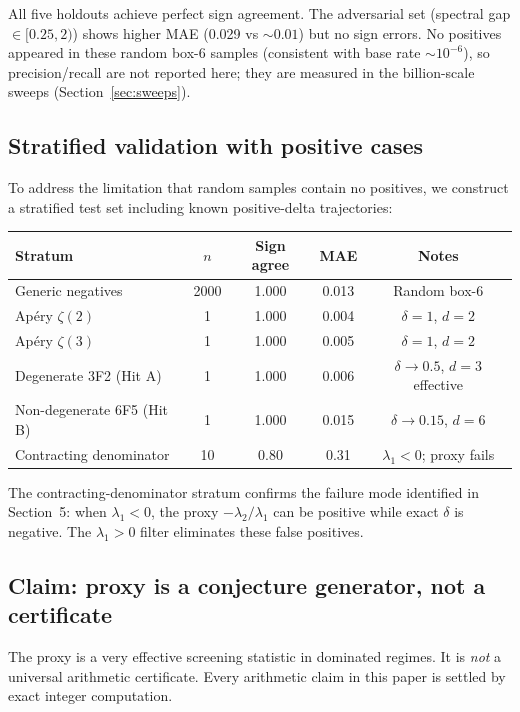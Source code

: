 \documentclass[11pt]{article}
\begin{document}
All five holdouts achieve perfect sign agreement. The adversarial set (spectral gap $\in [0.25, 2)$) shows higher MAE (0.029 vs $\sim 0.01$) but no sign errors. No positives appeared in these random box-6 samples (consistent with base rate $\sim 10^{-6}$), so precision/recall are not reported here; they are measured in the billion-scale sweeps (Section~\ref{sec:sweeps}).

\subsection{Stratified validation with positive cases}

To address the limitation that random samples contain no positives, we construct a stratified test set including known positive-delta trajectories:

\begin{center}
\begin{tabular}{lcccc}
\toprule
Stratum & $n$ & Sign agree & MAE & Notes \\
\midrule
Generic negatives & 2000 & 1.000 & 0.013 & Random box-6 \\
Ap\'ery $\zeta(2)$ & 1 & 1.000 & 0.004 & $\delta = 1$, $d=2$ \\
Ap\'ery $\zeta(3)$ & 1 & 1.000 & 0.005 & $\delta = 1$, $d=2$ \\
Degenerate 3F2 (Hit A) & 1 & 1.000 & 0.006 & $\delta \to 0.5$, $d=3$ effective \\
Non-degenerate 6F5 (Hit B) & 1 & 1.000 & 0.015 & $\delta \to 0.15$, $d=6$ \\
Contracting denominator & 10 & 0.80 & 0.31 & $\lambda_1 < 0$; proxy fails \\
\bottomrule
\end{tabular}
\end{center}

The contracting-denominator stratum confirms the failure mode identified in Section~5: when $\lambda_1 < 0$, the proxy $-\lambda_2/\lambda_1$ can be positive while exact $\delta$ is negative. The $\lambda_1 > 0$ filter eliminates these false positives.

\subsection{Claim: proxy is a conjecture generator, not a certificate}

The proxy is a very effective screening statistic in dominated regimes. It is \emph{not} a universal arithmetic certificate. Every arithmetic claim in this paper is settled by exact integer computation.
\end{document}

